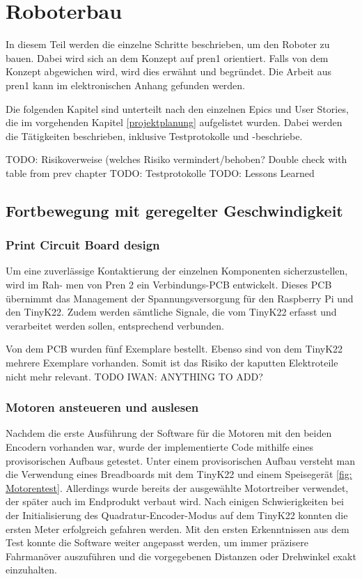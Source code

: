 \section{Roboterbau}

In diesem Teil werden die einzelne Schritte beschrieben, um den Roboter zu bauen. Dabei wird sich an dem Konzept auf \acrshort{pren1} orientiert. Falls von dem Konzept abgewichen wird, wird dies erwähnt und begründet. Die Arbeit aus \acrshort{pren1} kann im elektronischen Anhang gefunden werden.

Die folgenden Kapitel sind unterteilt nach den einzelnen Epics und User Stories, die im vorgehenden Kapitel \ref{projektplanung} aufgelistet wurden. Dabei werden die Tätigkeiten beschrieben, inklusive Testprotokolle und -beschriebe.

TODO: Risikoverweise (welches Risiko vermindert/behoben? Double check
with table from prev chapter 
TODO: Testprotokolle
TODO: Lessons Learned


\subsection{Fortbewegung mit geregelter Geschwindigkeit}

\subsubsection{Print Circuit Board design}
\label{pcb}

Um eine zuverlässige Kontaktierung der einzelnen Komponenten sicherzustellen, wird im Rah-
men von Pren 2 ein Verbindungs-PCB entwickelt. Dieses PCB übernimmt das Management der
Spannungsversorgung für den Raspberry Pi und den TinyK22. Zudem werden sämtliche Signale,
die vom TinyK22 erfasst und verarbeitet werden sollen, entsprechend verbunden.

Von dem PCB wurden fünf Exemplare bestellt. Ebenso sind von dem TinyK22 mehrere Exemplare vorhanden. Somit ist das Risiko der kaputten Elektroteile nicht mehr relevant. TODO IWAN: ANYTHING TO ADD?


\subsubsection{Motoren ansteueren und auslesen}

Nachdem die erste Ausführung der Software für die Motoren mit den beiden Encodern vorhanden war, wurde der implementierte Code mithilfe eines provisorischen Aufbaus getestet. Unter einem provisorischen Aufbau versteht man die Verwendung eines Breadboards mit dem TinyK22 und einem Speisegerät \ref{fig: Motorentest}. Allerdings wurde bereits der ausgewählte Motortreiber verwendet, der später auch im Endprodukt verbaut wird. Nach einigen Schwierigkeiten bei der Initialisierung des Quadratur-Encoder-Modus auf dem TinyK22 konnten die ersten Meter erfolgreich gefahren werden. Mit den ersten Erkenntnissen aus dem Test konnte die Software weiter angepasst werden, um immer präzisere Fahrmanöver auszuführen und die vorgegebenen Distanzen oder Drehwinkel exakt einzuhalten.


